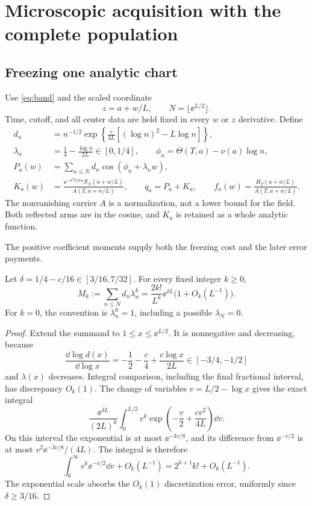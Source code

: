 \section{Microscopic acquisition with the complete population}\label{sec:micro}

\subsection{Freezing one analytic chart}

Use \eqref{eq:band} and the scaled coordinate
\[
 z=a+w/L,\qquad N=\lfloor\ee^{L/2}\rfloor.
\]
Time, cutoff, and all center data are held fixed in every \(w\) or
\(z\) derivative. Define
\begin{align}
 d_n&=n^{-1/2}\exp\left\{\frac{c}{4L}
                       [(\log n)^2-L\log n]\right\},\\
 \lambda_n&=\frac14-\frac{\log n}{2L}\in[0,1/4],\qquad
 \phi_n=\Theta(T,a)-\nu(a)\log n,\label{eq:frozendata}\\
 P_a(w)&=\sum_{n\le N}d_n\cos(\phi_n+\lambda_nw),\\
 K_a(w)&=\frac{\ee^{-\pi^2T/64}\mathcal R_N(a+w/L)}
                         {A(T,a+w/L)},\qquad
 q_a=P_a+K_a,\qquad f_a(w)=\frac{H_T(a+w/L)}{A(T,a+w/L)}.
 \label{eq:fq}
\end{align}
The nonvanishing carrier \(A\) is a normalization, not a lower bound for
the field. Both reflected arms are in the cosine, and \(K_a\) is retained
as a whole analytic function.

The positive coefficient moments supply both the freezing cost and the
later error payments.
\begin{lemma}\label{lem:moments}
Let \(\delta=1/4-c/16\in[3/16,7/32]\). For every fixed integer \(k\ge0\),
\begin{equation}\label{eq:moments}
 M_k:=\sum_{n\le N}d_n\lambda_n^k
 =\frac{2k!}{L^k}\ee^{\delta L}\bigl(1+O_k(L^{-1})\bigr).
\end{equation}
For \(k=0\), the convention is \(\lambda_n^0=1\), including a possible
\(\lambda_N=0\).
\end{lemma}
\begin{proof}
Extend the summand to \(1\le x\le\ee^{L/2}\). It is nonnegative and
decreasing, because
\[
 \frac{\dd\log d(x)}{\dd\log x}
 =-\frac12-\frac c4+\frac{c\log x}{2L}\in[-3/4,-1/2]
\]
and \(\lambda(x)\) decreases. Integral comparison, including the final
fractional interval, has discrepancy \(O_k(1)\). The change of variables
\(v=L/2-\log x\) gives the exact integral
\[
 \frac{\ee^{\delta L}}{(2L)^k}
 \int_0^{L/2}v^k\exp\left(-\frac v2+\frac{cv^2}{4L}\right)\dd v.
\]
On this interval the exponential is at most \(\ee^{-3v/8}\), and its
difference from \(\ee^{-v/2}\) is at most
\(v^2\ee^{-3v/8}/(4L)\). The integral is therefore
\[
 \int_0^\infty v^k\ee^{-v/2}\dd v+O_k(L^{-1})
 =2^{k+1}k!+O_k(L^{-1}).
\]
The exponential scale absorbs the \(O_k(1)\) discretization error,
uniformly since \(\delta\ge3/16\).
\end{proof}

